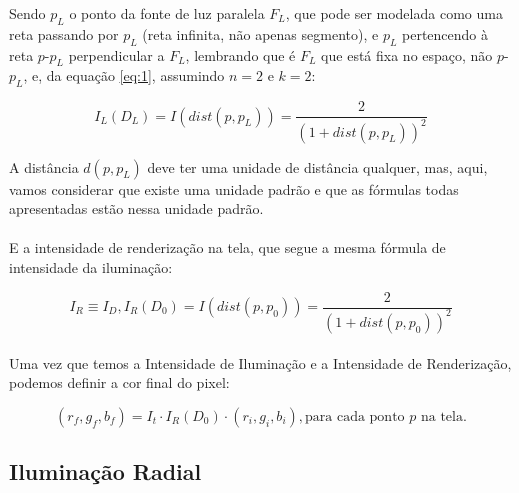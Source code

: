 \documentclass{article}
\begin{document}
	Sendo $p_L$ o ponto da fonte de luz paralela $F_L$, que pode ser modelada como uma reta passando por $p_L$ (reta infinita, não apenas segmento), e $p_L$ pertencendo à reta $p$-$p_L$ perpendicular a $F_L$, lembrando que é $F_L$ que está fixa no espaço, não $p$-$p_L$, e, da equação \ref{eq:1}, assumindo $n = 2$ e $k = 2$:
	
	\begin{equation} \label{eq:3}
		I_L(D_L) = I(dist(p, p_L)) =  \frac{2}{(1+dist(p, p_L))^2}
	\end{equation}
	
	A distância $d(p, p_L)$ deve ter uma unidade de distância qualquer, mas, aqui, vamos considerar que existe uma unidade padrão e que as fórmulas todas apresentadas estão nessa unidade padrão.
	
	\paragraph{}
	E a intensidade de renderização na tela, que segue a mesma fórmula de intensidade da iluminação:
	
	\begin{equation} \label{eq:4}
		I_R \equiv I_D, I_R(D_0) = I(dist(p, p_0)) = \frac{2}{(1+dist(p, p_0))^2}
	\end{equation}
	
	\paragraph{}
	Uma vez que temos a Intensidade de Iluminação e a Intensidade de Renderização, podemos definir a cor final do pixel:
	
	\begin{equation}
		(r_f, g_f, b_f) = I_t \cdot I_R(D_0) \cdot (r_i, g_i, b_i), \text{para cada ponto $p$ na tela}.
	\end{equation}
	
	\subsection{Iluminação Radial}
	
\end{document}
